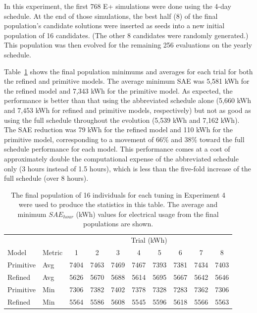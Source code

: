 \documentclass[preprint, review, 12pt]{elsarticle}
\begin{document}
In this experiment, the first 768 E+ simulations were done using the 4-day schedule. At the end of those simulations, the best half (8) of the final population's candidate solutions were inserted as seeds into a new initial population of 16 candidates. (The other 8 candidates were randomly generated.) This population was then evolved for the remaining 256 evaluations on the yearly schedule.

Table~\ref{tab:hourly-serial} shows the final population minimums and averages for each trial for both the refined and primitive models. The average minimum SAE was 5,581 kWh for the refined model and 7,343 kWh for the primitive model. As expected, the performance is better than that using the abbreviated schedule alone (5,660 kWh and 7,453 kWh for refined and primitive models, respectively) but not as good as using the full schedule throughout the evolution (5,539 kWh and 7,162 kWh). The SAE reduction was 79 kWh for the refined model and 110 kWh for the primitive model, corresponding to a movement of 66\% and 38\% toward the full schedule performance for each model. This performance comes at a cost of approximately double the computational expense of the abbreviated schedule only (3 hours instead of 1.5 hours), which is less than the five-fold increase of the full schedule (over 8 hours). 


\begin{table}[htbp]
\centering
\caption{The final population of 16 individuals for each tuning in Experiment 4 were used to produce the statistics in this table. The average and minimum $SAE_{hour}$ (kWh) values for electrical usage from the final populations are shown.}
\label{tab:hourly-serial}
\begin{tabular}{llcccccccc}
\toprule
 &  & \multicolumn{8}{c}{Trial (kWh)}\\
Model & Metric & 1 & 2 & 3 & 4 & 5 & 6 & 7 & 8\\
\midrule
Primitive & Avg & 7404 & 7463 & 7469 & 7467 & 7393 & 7381 & 7434 & 7403\\\rowcolor{DarkRow}
Refined   & Avg & 5626 & 5670 & 5688 & 5614 & 5695 & 5667 & 5642 & 5646\\
Primitive & Min & 7306 & 7382 & 7402 & 7378 & 7328 & 7283 & 7362 & 7306\\\rowcolor{DarkRow}
Refined   & Min & 5564 & 5586 & 5608 & 5545 & 5596 & 5618 & 5566 & 5563\\
\bottomrule
\end{tabular}
\end{table}
\end{document}
